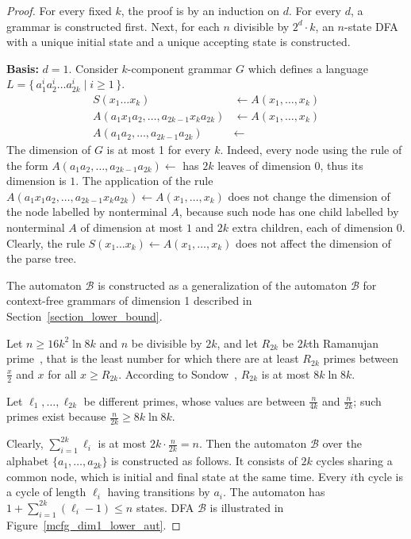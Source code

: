 \documentclass[runningheads]{llncs}
\newcommand{\set}[2]{\{ \, #1 \mid #2 \, \}}
\begin{document}
\begin{proof}
For every fixed $k$,
the proof is by an induction on $d$.
For every $d$, a grammar is constructed first.
Next, for each $n$ divisible by $2^d \cdot k$,
an $n$-state DFA with a unique initial state
and a unique accepting state is constructed.

\textbf{Basis:} $d = 1$.
Consider $k$-component grammar $G$ which defines a language
 $L = \set{a_1^i a_2^i \ldots a_{2k}^i}{i \geqslant 1}$.
\begin{align*}
	S(x_1\ldots x_k)
	&\gets
	A(x_1, \ldots, x_k)
		\\
	A(a_1x_1a_2, \ldots, a_{2k-1}x_ka_{2k})
	&\gets
	A(x_1, \ldots, x_k) 
		\\
	A(a_1a_2, \ldots, a_{2k-1}a_{2k} ) &\gets
\end{align*}
The dimension of $G$ is at most 1 for every $k$. 
Indeed, every node using the rule of the form 
$A(a_1a_2, \ldots, a_{2k-1}a_{2k} ) \gets$ has $2k$ leaves of dimension 0, thus
its dimension is $1$.
The application of the rule $A(a_1x_1a_2, \ldots, a_{2k-1}x_ka_{2k})
	\gets
	A(x_1, \ldots, x_k)$ does not change the dimension of the node labelled by
 nonterminal $A$, because such node has one child labelled by nonterminal $A$ of 
dimension at most $1$ and $2k$ extra children, each of dimension $0$.
Clearly, the rule $S(x_1\ldots x_k)
	\gets
	A(x_1, \ldots, x_k)$ does not affect the dimension of the parse tree.

The automaton $\mathcal{B}$ is constructed as a generalization 
of the automaton $\mathcal{B}$ for context-free grammars of dimension 1
 described in Section~\ref{section_lower_bound}.

Let $n \geqslant 16 k^2 \ln 8k$ and $n$ be divisible by $2k$, and let $R_{2k}$ be 
$2k$th Ramanujan prime~\cite{ramanujan1919proof}, that is the least number
for which there are at least $R_{2k}$ primes between $\frac{x}{2}$ and $x$ for all 
$x \geqslant R_{2k}$. According to Sondow~\cite{Sondow}, 
$R_{2k}$ is at most $8k \ln 8k$.

Let $\ell_1, \ldots, \ell_{2k}$ be different primes, whose values are 
between $\frac{n}{4k}$ and $\frac{n}{2k}$; such primes exist because
 $\frac{n}{2k} \geqslant 8k \ln 8k$.

Clearly, $\sum_{i=1}^{2k} \ell_i$ is at most $2k \cdot \frac{n}{2k} = n$.
Then the automaton $\mathcal{B}$ 
over the alphabet $\{a_1, \ldots, a_{2k}\}$ is constructed as follows.
It consists of $2k$ cycles sharing a common node, which is initial and final state
 at the same time. Every $i$th cycle is a cycle of length $\ell_i$ having transitions by 
$a_i$. The automaton has $1 + \sum_{i=1}^{2k} (\ell_i-1) \leqslant n$ states.
DFA $\mathcal{B}$ is illustrated in Figure~\ref{mcfg_dim1_lower_aut}.



\end{proof}
\end{document}
